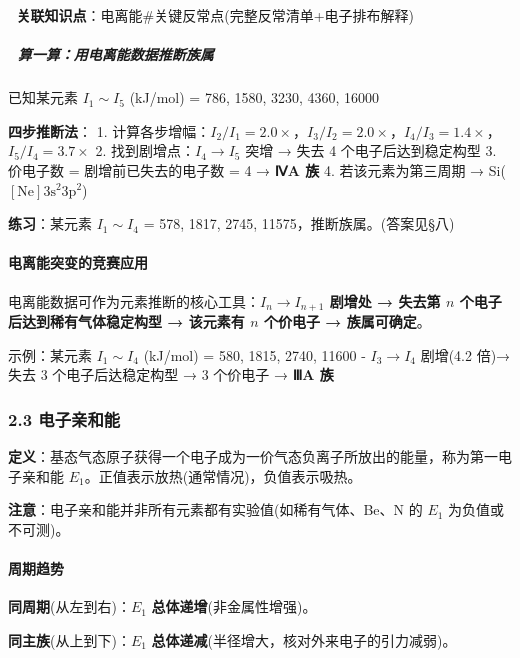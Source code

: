 🔗 \textbf{关联知识点}：电离能\#关键反常点(完整反常清单+电子排布解释)

\subparagraph{📝 算一算：用电离能数据推断族属}\label{ux7b97ux4e00ux7b97ux7528ux7535ux79bbux80fdux6570ux636eux63a8ux65adux65cfux5c5e}

已知某元素 \(I_1\sim I_5\) (kJ/mol) = 786, 1580, 3230, 4360, 16000

\textbf{四步推断法}：
1. 计算各步增幅：\(I_2/I_1=2.0\times\)，\(I_3/I_2=2.0\times\)，\(I_4/I_3=1.4\times\)，\(I_5/I_4=3.7\times\)
2. 找到剧增点：\(I_4\to I_5\) 突增 → 失去 4 个电子后达到稳定构型
3. 价电子数 = 剧增前已失去的电子数 = 4 → \textbf{ⅣA 族}
4. 若该元素为第三周期 → Si(\([\mathrm{Ne}]3\mathrm{s}^2 3\mathrm{p}^2\))

\textbf{练习}：某元素 \(I_1\sim I_4\) = 578, 1817, 2745, 11575，推断族属。(答案见§八)

\paragraph{电离能突变的竞赛应用}\label{ux7535ux79bbux80fdux7a81ux53d8ux7684ux7adeux8d5bux5e94ux7528}

电离能数据可作为元素推断的核心工具：\textbf{\(I_n \to I_{n+1}\) 剧增处 → 失去第 \(n\) 个电子后达到稀有气体稳定构型 → 该元素有 \(n\) 个价电子 → 族属可确定}。

示例：某元素 \(I_1\sim I_4\) (kJ/mol) = 580, 1815, 2740, 11600
- \(I_3\to I_4\) 剧增(4.2 倍)→ 失去 3 个电子后达稳定构型 → 3 个价电子 → \textbf{ⅢA 族}

\subsubsection{2.3 电子亲和能}\label{ux7535ux5b50ux4eb2ux548cux80fd}

\textbf{定义}：基态气态原子获得一个电子成为一价气态负离子所放出的能量，称为第一电子亲和能 \(E_1\)。正值表示放热(通常情况)，负值表示吸热。

\textbf{注意}：电子亲和能并非所有元素都有实验值(如稀有气体、Be、N 的 \(E_1\) 为负值或不可测)。

\paragraph{周期趋势}\label{ux5468ux671fux8d8bux52bf-1}

\textbf{同周期}(从左到右)：\(E_1\) \textbf{总体递增}(非金属性增强)。

\textbf{同主族}(从上到下)：\(E_1\) \textbf{总体递减}(半径增大，核对外来电子的引力减弱)。

